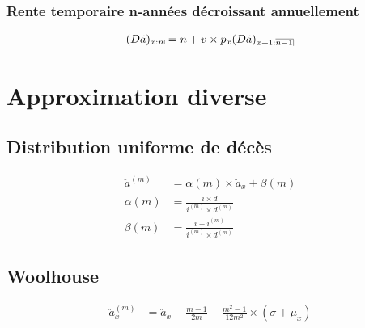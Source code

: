 \documentclass[11pt,french]{report}
\makeatletter
\DeclareRobustCommand{\annuity}[1]{%
\def\arraystretch{0}%
\setlength\arraycolsep{.7pt}%
\setlength\arrayrulewidth{.3pt}%
\begin{array}[b]{@{}c|}\hline
\\[\arraycolsep]%
\scriptstyle #1%
\end{array}%
}
\makeatother
\begin{document}
\subsection{Rente temporaire n-années décroissant annuellement}
\begin{align*}
(D\ddot{a})_{x:\annuity{n}} &= n + v \times p_x  (D\ddot{a})_{x + 1:\annuity{n -1}}\\
\end{align*}

\chapter{Approximation diverse}

\section{Distribution uniforme de décès}
\begin{align*}
\ddot{a}^{(m)} &= \alpha(m) \times \ddot{a}_x + \beta(m) \\
\alpha(m) &= \frac{i \times d}{i^{(m)} \times d^{(m)}} \\
\beta(m) &= \frac{i - i^{(m)}}{i^{(m)} \times d^{(m)}}
\end{align*}

\section{Woolhouse}
\begin{align*}
\ddot{a}_x^{(m)} &= \ddot{a}_x - \frac{m -1}{2m}  - \frac{m^2 -1}{12 m^2}\times (\sigma + \mu_x)\\
\end{align*}
\end{document}
